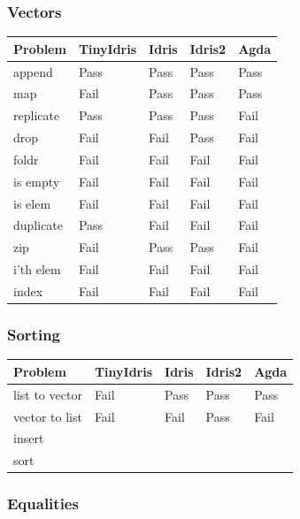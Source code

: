 \documentclass[a4paper]{article}
\begin{document}
\subsubsection{Vectors}
\label{sec:org90a9e60}
\begin{center}
\begin{tabular}{lllll}
Problem & TinyIdris & Idris & Idris2 & Agda\\
\hline
append & Pass & Pass & Pass & Pass\\
map & Fail & Pass & Pass & Pass\\
replicate & Pass & Pass & Pass & Fail\\
drop & Fail & Fail & Pass & Fail\\
foldr & Fail & Fail & Fail & Fail\\
is empty & Fail & Fail & Fail & Fail\\
is elem & Fail & Fail & Fail & Fail\\
duplicate & Pass & Fail & Fail & Fail\\
zip & Fail & Pass & Pass & Fail\\
i'th elem & Fail & Fail & Fail & Fail\\
index & Fail & Fail & Fail & Fail\\
\end{tabular}
\end{center}

\subsubsection{Sorting}
\label{sec:org267f595}
\begin{center}
\begin{tabular}{lllll}
Problem & TinyIdris & Idris & Idris2 & Agda\\
\hline
list to vector & Fail & Pass & Pass & Pass\\
vector to list & Fail & Fail & Pass & Fail\\
insert &  &  &  & \\
sort &  &  &  & \\
\end{tabular}
\end{center}

\subsubsection{Equalities}
\label{sec:org549b2b4}
\end{document}
